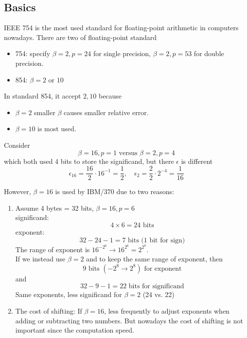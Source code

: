 \subsection{Basics}

IEEE 754 is the most used standard for floating-point arithmetic in computers nowadays. There are two of floating-point standard
\begin{itemize}
    \item 754: specify $\beta = 2, p = 24$ for single precision, $\beta = 2, p = 53$ for double precision.
    \item 854: $\beta = 2 \text{ or } 10$
\end{itemize}

\begin{note}
    In standard 854, it accept $2, 10$ because 
    \begin{itemize}
        \item $\beta = 2$ smaller $\beta$ causes smaller relative error.
        \item $\beta = 10$ is most used.
    \end{itemize}
\end{note}

Consider
\[
    \beta = 16, p = 1\text{ versus }\beta = 2, p = 4
\]
which both used 4 bits to store the significand, but there $\epsilon$ is different \[
    \epsilon_{16} = \frac{16}{2} \cdot 16^{-1} = \frac{1}{2}, \quad \epsilon_2 = \frac{2}{2} \cdot 2^{-4} = \frac{1}{16}
\]

However, $\beta = 16$ is used by IBM/370 due to two reasons:
\begin{enumerate}[label=$\arabic*^\circ$]
    \item Assume 4 bytes = 32 bits, $\beta = 16, p = 6$ \\
    significand: \[
        4 \times 6 = 24 \text{ bits}
    \]
    exponent: \[
        32 - 24 - 1 = 7 \text{ bits (1 bit for sign)}
    \]
    The range of exponent is $16^{-2^6} \to 16^{2^6} = 2^{2^8}$.\\
    If we instead use $\beta = 2$ and to keep the same range of exponent, then \[
        9 \text{ bits } (-2^{8} \to 2^8) \text{ for exponent}
    \]
    and \[
        32 - 9 - 1 = 22 \text{ bits for significand}
    \]
    Same exponents, less significand for $\beta = 2$ (24 vs. 22)
    \item The cost of shifting: If $\beta = 16$, less frequently to adjust exponents when adding or subtracting two numbers. But nowadays the cost of shifting is not important since the computation speed.
\end{enumerate}

